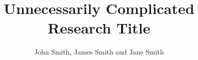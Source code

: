 \documentclass{beamer}
\begin{document}

\newlength{\sepwid}
\newlength{\onecolwid}
\newlength{\twocolwid}
\newlength{\threecolwid}
\setlength{\paperwidth}{36in} %
\setlength{\paperheight}{48in} %
\setlength{\sepwid}{0.024\paperwidth} %
\setlength{\onecolwid}{0.22\paperwidth} %
\setlength{\twocolwid}{0.464\paperwidth} %
\setlength{\threecolwid}{0.708\paperwidth} %
\setlength{\topmargin}{-0.5in} %

\usepackage{graphicx}  %

\usepackage{booktabs} %


\title{Unnecessarily Complicated Research Title} %

\author{John Smith, James Smith and Jane Smith} %


\end{document}
